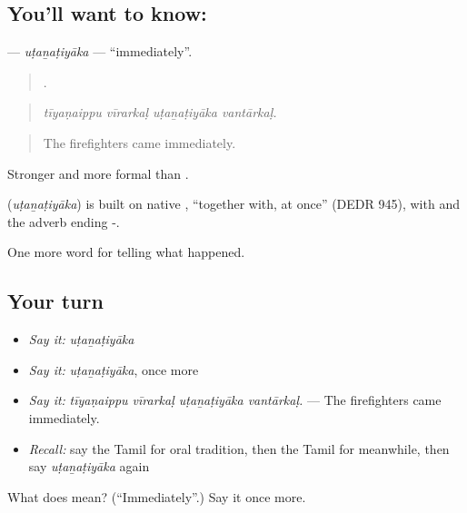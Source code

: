 \subsection*{You'll want to know: }
\textbf{} — \emph{uṭaṉaṭiyāka} — \textquotedblleft{}immediately\textquotedblright{}.

\begin{quote}
   .
\end{quote}

\begin{quote}
\emph{tīyaṇaippu vīrarkaḷ uṭaṉaṭiyāka vantārkaḷ.}
\end{quote}

\begin{quote}
The firefighters came immediately.
\end{quote}

Stronger and more formal than .

\begin{cousinweb}
\textbf{} (\emph{uṭaṉaṭiyāka}) is built on native , \textquotedblleft{}together with, at once\textquotedblright{} (DEDR 945), with  and the adverb ending -.
\end{cousinweb}

\begin{grammarlens}[title={What you've built}]
One more word for telling what happened.
\end{grammarlens}

\subsection*{Your turn}
\begin{itemize}
\raggedright
  \item \emph{Say it:} \emph{uṭaṉaṭiyāka}
  \item \emph{Say it:} \emph{uṭaṉaṭiyāka}, once more
  \item \emph{Say it:} \emph{tīyaṇaippu vīrarkaḷ uṭaṉaṭiyāka vantārkaḷ.} — The firefighters came immediately.
  \item \emph{Recall:} say the Tamil for oral tradition, then the Tamil for meanwhile, then say \emph{uṭaṉaṭiyāka} again
\end{itemize}

\begin{tcolorbox}[breakable,colback=teal!4,colframe=teal!35!black,title={Before you move on}]
What does  mean? (\textquotedblleft{}Immediately\textquotedblright{}.) Say it once more.
\end{tcolorbox}
